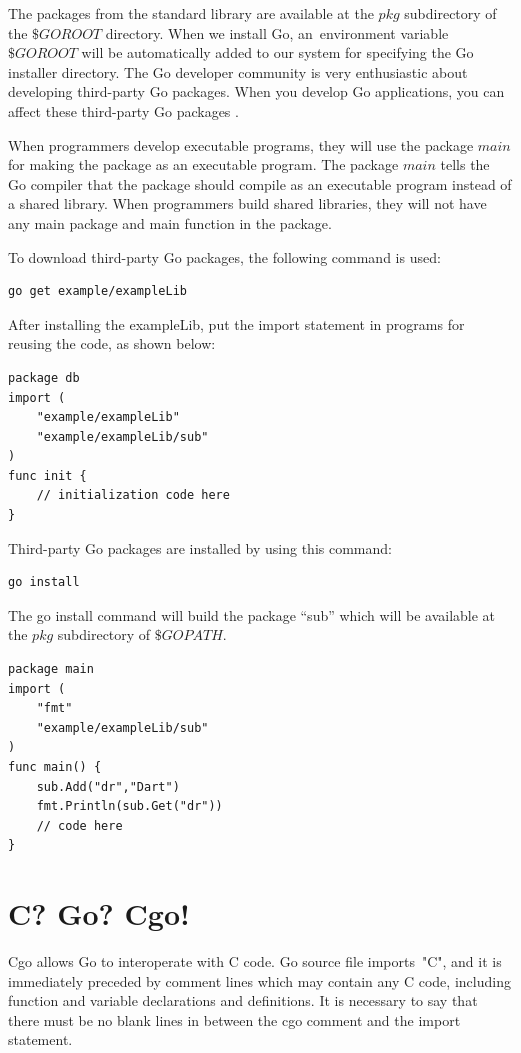 \documentclass[
  twoside, 12pt, 
  printed, %
  notable,   %
  lof,     %
  lot,     %
]{fithesis3}
\begin{document}
The packages from the standard library are available at the $pkg$ subdirectory of the $\$GOROOT$ 
directory. When we install Go, an~environment variable $\$GOROOT$ will be automatically added to 
our system for specifying the Go installer directory. The Go developer community is very 
enthusiastic about developing third-party Go packages. When you develop Go applications, you can 
affect these third-party Go packages \cite{stack_2014}.

When programmers develop executable programs, they will use the package $main$ for making the 
package as an executable program. The package $main$ tells the Go compiler that the package 
should compile as an executable program instead of a shared library. When programmers build 
shared libraries, they will not have any main package and main function in the package.

To download third-party Go packages, the following command is used: 
\begin{lstlisting}
go get example/exampleLib
\end{lstlisting}
After installing the exampleLib, put the import statement in programs for reusing the code, as 
shown below:
\begin{lstlisting}
package db
import (
	"example/exampleLib"
	"example/exampleLib/sub"
)
func init {
	// initialization code here    
}
\end{lstlisting}
Third-party Go packages are installed by using this command: 
\begin{lstlisting}
go install
\end{lstlisting}
The go install command will build the package “sub” which will be available at the $pkg$ 
subdirectory of $\$GOPATH$.
\begin{lstlisting}
package main
import (
	"fmt"
	"example/exampleLib/sub"
)
func main() {
    sub.Add("dr","Dart")
    fmt.Println(sub.Get("dr"))
    // code here    
}
\end{lstlisting}

\section{C? Go? Cgo!}\label{cgo}
Cgo allows Go to interoperate with C code. Go source file imports~"C", and it is immediately 
preceded by comment lines which may contain any C code, including function and variable 
declarations and definitions. It is necessary to say that there must be no blank lines in 
between the cgo comment and the import statement. 
\end{document}
